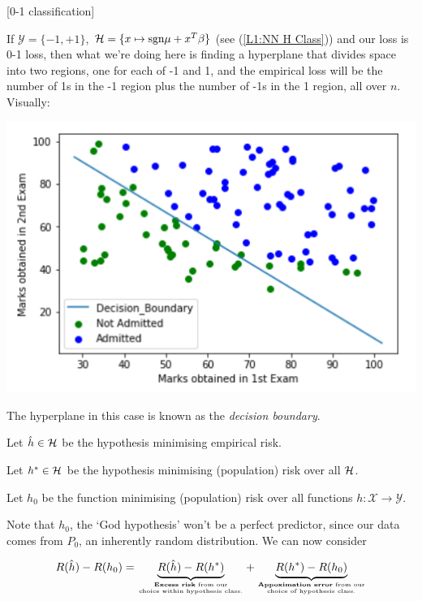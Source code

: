 \documentclass[11pt]{scrartcl}
\begin{document}
\begin{example}
[0-1 classification]

If $\mathcal{Y}= \{ -1, +1 \}$, $\mathcal{H} = \{ x \mapsto \text{sgn}{\mu + x^T \beta} \}$ (see (\ref{L1:NN H Class})) and our loss is 0-1 loss, then what we're doing here is finding a hyperplane that divides space into two regions, one for each of -1 and 1, and the empirical loss will be the number of 1s in the -1 region plus the number of -1s in the 1 region, all over $n$. Visually:

\begin{center}              \includegraphics[scale=0.5]{decisionboundary.png}
    \label{fig:L2 Decision Boundary}
\end{center}

The hyperplane in this case is known as the \emph{decision boundary}.
\end{example}

\begin{definition}

Let $\hat{h} \in \mathcal{H}$ be the hypothesis minimising empirical risk.

Let $h^* \in \mathcal{H}$ be the hypothesis minimising (population) risk over all $\mathcal{H}$.

Let $h_0$ be the function minimising (population) risk over all functions $h : \mathcal{X} \to \mathcal{Y}$.
\end{definition}

Note that $h_0$, the `God hypothesis' won't be a perfect predictor, since our data comes from $P_0$, an inherently random distribution. 
We can now consider

\begin{equation}
    R(\hat{h}) - R(h_0) = \underbrace{R(\hat{h}) - R(h^*)}_{\text{\textbf{Excess risk} from our}\atop \text{choice within hypothesis class.}} + \underbrace{R(h^*) - R(h_0)} _{\text{\textbf{Appoximation error} from our} \atop \text{choice of hypothesis class.}}
\label{L2:excess risk and approx error}
\end{equation}
\end{document}
